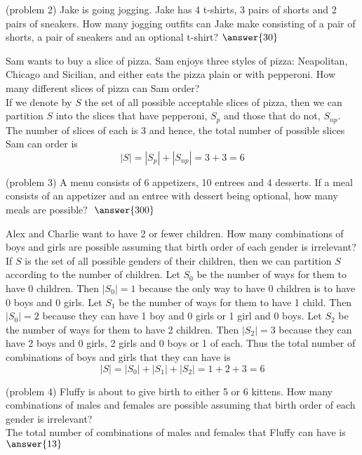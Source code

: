 \documentclass[handout]{ximera}
\begin{document}
\begin{problem}(problem 2)
Jake is going jogging.  Jake has 4 t-shirts, 3 pairs of shorts and 2 pairs of sneakers.
How many jogging outfits can Jake make consisting of a pair of shorts, a pair of sneakers and an optional t-shirt? \; $\answer{30}$
\end{problem}


\begin{example}[example 3]
Sam wants to buy a slice of pizza.  
Sam enjoys three styles of pizza: Neapolitan, Chicago and Sicilian, 
and either eats the pizza plain or with pepperoni.  
How many different slices of pizza can Sam order?\\
If we denote by $S$ the set of all possible acceptable slices of pizza, 
then we can partition $S$ into the slices that have pepperoni, $S_p$ and 
those that do not, $S_{np}$. The number of slices of each is 3 and 
hence, the total number of possible slices Sam can order is
\[
|S| = |S_p| + |S_{np}| = 3+3 =6
\]
\end{example}

\begin{problem}(problem 3)
A menu consists of 6 appetizers, 10 entrees and 4 desserts. 
If a meal consists of an appetizer and an entree with dessert being 
optional, how many meals are possible?
$\; \answer{300}$
\end{problem}




\begin{example}[example 4]
Alex and Charlie want to have 2 or fewer children.  
How many combinations of boys and girls are possible assuming 
that birth order of each gender is irrelevant?\\

If $S$ is the set of all possible genders of their children, then we can partition $S$ according to the number of children. Let $S_0$ be the number of ways for them to have 0 children. Then $|S_0| = 1$ because the only way to have 0 children is to have 0 boys and 0 girls. Let $S_1$ be the number of ways for them to have 1 child. Then $|S_0| = 2$ because they can have 1 boy and 0 girls or 1 girl and 0 boys.
 Let $S_2$ be the number of ways for them to have 2 children. Then $|S_2| = 3$ because they
 can have 2 boys and 0 girls, 2 girls and 0 boys or 1 of each.
 Thus the total number of combinations of boys and girls that they can have is
 \[
 |S| = |S_0|+|S_1|+|S_2|= 1 + 2+3 = 6
 \]
 \end{example}
 

\begin{problem}(problem 4)
Fluffy is about to give birth to either 5 or 6 kittens.  
How many combinations of males and females are possible assuming 
that birth order of each gender is irrelevant?\\
The total number of combinations of males and females that Fluffy can have is
$\answer{13}$
\end{problem}
\end{document}
